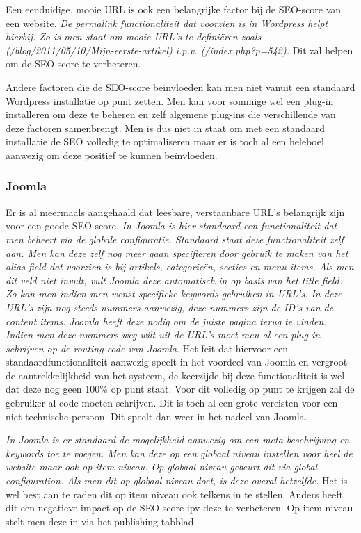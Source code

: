 Een eenduidige, mooie URL is ook een belangrijke factor bij de SEO-score van een website. \textit{De permalink functionaliteit dat voorzien is in Wordpress helpt hierbij. Zo is men staat om mooie URL's te definiëren zoals (/blog/2011/05/10/Mijn-eerste-artikel) i.p.v. (/index.php?p=542).}\autocite{WordpressCommunity2019f} Dit zal helpen om de SEO-score te verbeteren.

Andere factoren die de SEO-score beinvloeden kan men niet vanuit een standaard Wordpress installatie op punt zetten. Men kan voor sommige wel een plug-in installeren om deze te beheren en zelf algemene plug-ins die verschillende van deze factoren samenbrengt. Men is dus niet in staat om met een standaard installatie de SEO volledig te optimaliseren maar er is toch al een heleboel aanwezig om deze positief te kunnen beïnvloeden.
\subsubsection{Joomla}
Er is al meermaals aangehaald dat leesbare, verstaanbare URL's belangrijk zijn voor een goede SEO-score. \textit{In Joomla is hier standaard een functionaliteit dat men beheert via de globale configuratie. Standaard staat deze functionaliteit zelf aan. Men kan deze zelf nog meer gaan specifieren door gebruik te maken van het alias field dat voorzien is bij artikels, categorieën, secties en menu-items. Als men dit veld niet invult, vult Joomla deze automatisch in op basis van het title field. Zo kan men indien men wenst specifieke keywords gebruiken in URL's. In deze URL's zijn nog steeds nummers aanwezig, deze nummers zijn de ID's van de content items. Joomla heeft deze nodig om de juiste pagina terug te vinden. Indien men deze nummers weg wilt uit de URL's moet men al een plug-in schrijven op de routing code van Joomla}. \autocite{JoomlaCommunity2019g} Het feit dat hiervoor een standaardfunctionaliteit aanwezig speelt in het voordeel van Joomla en vergroot de aantrekkelijkheid van het systeem, de keerzijde bij deze functionaliteit is wel dat deze nog geen 100\% op punt staat. Voor dit volledig op punt te krijgen zal de gebruiker al code moeten schrijven. Dit is toch al een grote vereisten voor een niet-technische persoon. Dit speelt dan weer in het nadeel van Joomla.

\textit{In Joomla is er standaard de mogelijkheid aanwezig om een meta beschrijving en keywords toe te voegen. Men kan deze op een globaal niveau instellen voor heel de website maar ook op item niveau. Op globaal niveau gebeurt dit via global configuration. Als men dit op globaal niveau doet, is deze overal hetzelfde. }\autocite{JoomlaCommunity2019f,JoomlaCommunity2019h} Het is wel best aan te raden dit op item niveau ook telkens in te stellen. Anders heeft dit een negatieve impact op de SEO-score ipv deze te verbeteren. Op item niveau stelt men deze in via het publishing tabblad.

